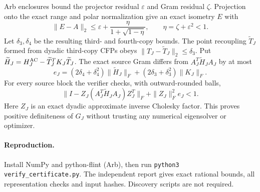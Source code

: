 \documentclass[11pt]{article}
\begin{document}
Arb enclosures bound the projector residual $\varepsilon$ and Gram residual $\zeta$. Projection onto the exact range and polar normalization give an exact isometry $E$ with
\[
 \|E-A\|_2\le\varepsilon+\frac{\eta}{1+\sqrt{1-\eta}},\qquad\eta=\zeta+\varepsilon^2<1.
\]
Let $\delta_3,\delta_4$ be the resulting third- and fourth-copy bounds. The point recoupling $\widetilde T_J$ formed from dyadic third-copy CFPs obeys $\|T_J-\widetilde T_J\|_2\le\delta_3$. Put $\widetilde H_J=H_J^{\rm AC}-\widetilde T_J^TK_J\widetilde T_J$. The exact source Gram differs from $A_J^T\widetilde H_JA_J$ by at most
\[
 e_J=(2\delta_4+\delta_4^2)\|\widetilde H_J\|_F+
 (2\delta_3+\delta_3^2)\|K_J\|_F.
\]
For every source block the verifier checks, with outward-rounded balls,
\[
 \|I-Z_J(A_J^T\widetilde H_JA_J)Z_J^T\|_F+\|Z_J\|_F^2e_J<1.
\]
Here $Z_J$ is an exact dyadic approximate inverse Cholesky factor. This proves positive definiteness of $G_J$ without trusting any numerical eigensolver or optimizer.

\paragraph{Reproduction.}Install NumPy and python-flint (Arb), then run \texttt{python3 verify\_certificate.py}. The independent report gives exact rational bounds, all representation checks and input hashes. Discovery scripts are not required.
\end{document}
